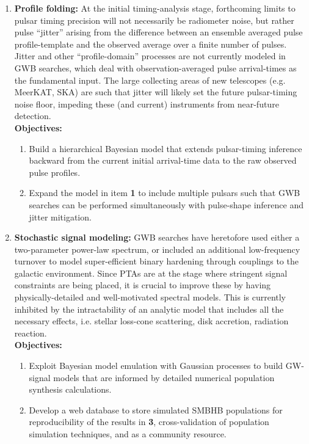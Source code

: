 \documentclass[11pt,letterpaper,sans]{moderncv} %
\begin{document}
\begin{enumerate} [label=\textbf{\Alph*}]  
\setlength\itemsep{0em}
\item \textbf{Profile folding:} At the initial timing-analysis stage, forthcoming limits to pulsar timing precision will not necessarily be radiometer noise, but rather pulse ``jitter'' arising from the difference between an ensemble averaged pulse profile-template and the observed average over a finite number of pulses. Jitter and other ``profile-domain'' processes are not currently modeled in GWB searches, which deal with observation-averaged pulse arrival-times as the fundamental input. The large collecting areas of new telescopes (e.g. MeerKAT, SKA) are such that jitter will likely set the future pulsar-timing noise floor, impeding these (and current) instruments from near-future detection. 
\\\textbf{Objectives:}
\begin{enumerate}[label=\textbf{\arabic*})] 
\setlength\itemsep{0em}
\item Build a hierarchical Bayesian model that extends pulsar-timing inference backward from the current initial arrival-time data to the raw observed pulse profiles. 
\item Expand the model in item \textbf{1} to include multiple pulsars such that GWB searches can be performed simultaneously with pulse-shape inference and jitter mitigation. 
\end{enumerate}
\item \textbf{Stochastic signal modeling:} GWB searches have heretofore used either a two-parameter power-law spectrum, or included an additional low-frequency turnover to model super-efficient binary hardening through couplings to the galactic environment. Since PTAs are at the stage where stringent signal constraints are being placed, it is crucial to improve these by having physically-detailed and well-motivated spectral models. This is currently inhibited by the intractability of an analytic model that includes all the necessary effects, i.e. stellar loss-cone scattering, disk accretion, radiation reaction.
\\\textbf{Objectives:}
\begin{enumerate}[label=\textbf{\arabic*})] 
\setlength\itemsep{0em}
\setcounter{enumii}{2}
\item Exploit Bayesian model emulation with Gaussian processes to build GW-signal models that are informed by detailed numerical population synthesis calculations. 
\item Develop a web database to store simulated SMBHB populations for reproducibility of the results in \textbf{3}, cross-validation of population simulation techniques, and as a community resource. 
\end{enumerate}
\end{enumerate}
\end{document}
